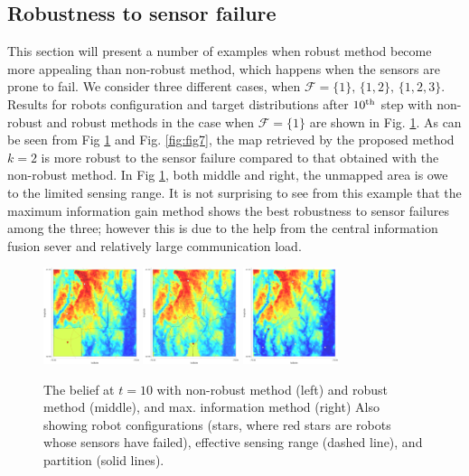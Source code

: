 \documentclass[letterpaper, 10 pt, conference]{ieeeconf}
\begin{document}
\subsection{Robustness to sensor failure}
This section will present a number of examples when robust method become more appealing than non-robust method, which happens when the sensors are prone to fail. 
We consider three different cases, when $\mathcal{F} = \lbrace 1 \rbrace,\,\lbrace 1,2\rbrace,\,\lbrace 1,2,3 \rbrace$.
Results for robots configuration and target distributions after $10^{\textup{th}}$ step with non-robust and robust methods in the case when $\mathcal{F}= \lbrace 1\rbrace$ are shown in Fig. \ref{fig:fig6}. 
As can be seen from Fig \ref{fig:fig6} and Fig. \ref{fig:fig7}, the map retrieved by the proposed method $k=2$ is more robust to the sensor failure compared to that obtained with the non-robust method. In Fig \ref{fig:fig6}, both middle and right, the unmapped area is owe to the limited sensing range.
It is not surprising to see from this example that the maximum information gain method shows the best robustness to sensor failures among the three; however this is due to the help from the central information fusion sever and relatively large communication load.
\begin{figure}
	\centering
	\includegraphics[width=1.1in]{figure/order1_conf}
	\includegraphics[width=1.1in]{figure/order2_conf}
	\includegraphics[width=1.1in]{figure/final_config_ordern_fault}
	\caption{The belief at $t=10$ with non-robust method (left) and robust method (middle), and max. information method (right) Also showing robot configurations (stars, where red stars are robots whose sensors have failed), effective sensing range (dashed line), and partition (solid lines).
	}
	\label{fig:fig6}
\end{figure}
\end{document}
